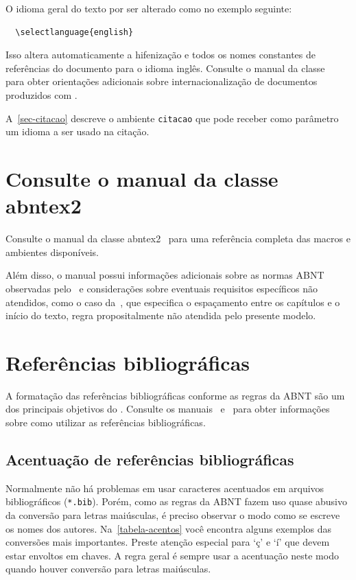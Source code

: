 O idioma geral do texto por ser alterado como no exemplo seguinte:

\begin{verbatim}
  \selectlanguage{english}
\end{verbatim}

Isso altera automaticamente a hifenização e todos os nomes constantes de
referências do documento para o idioma inglês. Consulte o manual da classe~\cite{abntex2classe} para obter orientações adicionais sobre internacionalização de
documentos produzidos com \abnTeX.

A~\autoref{sec-citacao} descreve o ambiente \texttt{citacao} que pode receber
como parâmetro um idioma a ser usado na citação.

\section{Consulte o manual da classe \textsf{abntex2}}

Consulte o manual da classe \textsf{abntex2}~\cite{abntex2classe} para uma
referência completa das macros e ambientes disponíveis.

Além disso, o manual possui informações adicionais sobre as normas ABNT
observadas pelo \abnTeX\ e considerações sobre eventuais requisitos específicos
não atendidos, como o caso da~, que
especifica o espaçamento entre os capítulos e o início do texto, regra
propositalmente não atendida pelo presente modelo.

\section{Referências bibliográficas}

A formatação das referências bibliográficas conforme as regras da ABNT são um
dos principais objetivos do \abnTeX. Consulte os manuais~ e~ para obter informações
sobre como utilizar as referências bibliográficas.

\subsection{Acentuação de referências bibliográficas}

Normalmente não há problemas em usar caracteres acentuados em arquivos
bibliográficos (\texttt{*.bib}). Porém, como as regras da ABNT fazem uso quase
abusivo da conversão para letras maiúsculas, é preciso observar o modo como se
escreve os nomes dos autores. Na~\autoref{tabela-acentos} você encontra alguns
exemplos das conversões mais importantes. Preste atenção especial para `ç' e `í'
que devem estar envoltos em chaves. A regra geral é sempre usar a acentuação
neste modo quando houver conversão para letras maiúsculas.

